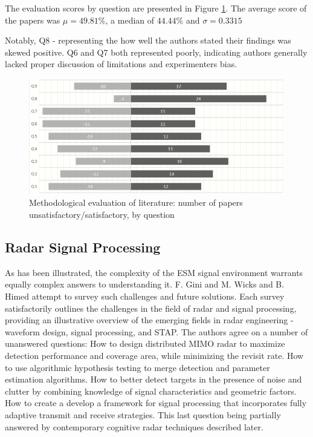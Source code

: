 The evaluation scores by question are presented in Figure \ref{fig:lit_chart}.
The average score of the papers was \(\mu=49.81\%\), a median of \(44.44\%\) and \(\sigma=0.3315\)

Notably, Q8 - representing the how well the authors stated their findings was skewed positive.
Q6 and Q7 both represented poorly, indicating authors generally lacked proper discussion of limitations and experimenters bias.

\begin{figure}[ht]
    \centering
    \includegraphics[width=1\textwidth]{Figures/lit_chart.PNG}
    \caption{Methodological evaluation of literature: number of papers unsatisfactory/satisfactory, by question}
    \label{fig:lit_chart}
\end{figure}


\subsection{Radar Signal Processing}
As has been illustrated, the complexity of the \ac{ESM} signal environment warrants equally complex answers to understanding it.
F. Gini \cite{gini_grand_2021} and M. Wicks and B. Himed \cite{wicks_four_2004} attempt to survey such challenges and future solutions. 
Each survey satisfactorily outlines the challenges in the field of radar and signal processing, providing an illustrative overview of the emerging fields in radar engineering - waveform design, signal processing, and \ac{STAP}.
The authors agree on a number of unanswered questions:
How to design distributed \ac{MIMO} radar to maximize detection performance and coverage area, while minimizing the revisit rate.
How to use algorithmic hypothesis testing to merge detection and parameter estimation algorithms.
How to better detect targets in the presence of noise and clutter by combining knowledge of signal characteristics and geometric factors.
How to create a develop a framework for signal processing that incorporates fully adaptive transmit and receive strategies.
This last question being partially answered by contemporary cognitive radar techniques described later.

